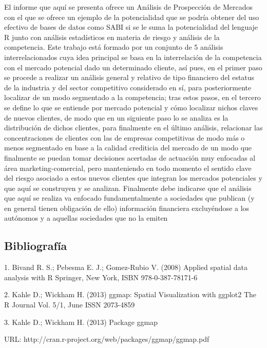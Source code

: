     El informe que aquí se presenta ofrece un Análisis de Prospección de Mercados con el que se ofrece un ejemplo de la potencialidad que se podría obtener del uso efectivo de bases de datos como SABI si se le suma la potencialidad del lenguaje R junto con análisis estadísticos en materia de riesgo y análisis de la competencia.
    Este trabajo está formado por un conjunto de 5 análisis interrelacionados cuya idea principal se basa en la interrelación de la competencia con el mercado potencial dado un determinado cliente, así pues, en el primer paso se procede a realizar un análisis general y relativo de tipo financiero del estatus de la industria y del sector competitivo considerado en sí, para posteriormente localizar de un modo segmentado a la competencia; tras estos pasos, en el tercero se define lo que se entiende por mercado potencial y cómo localizar nichos claves de nuevos clientes, de modo que en un siguiente paso lo se analiza es la distribución de dichos clientes, para finalmente en el último análisis, relacionar las concentraciones de clientes con las de empresas competitivas de modo más o menos segmentado en base a la calidad crediticia del mercado de un modo que finalmente se puedan tomar decisiones acertadas de actuación muy enfocadas al área marketing-comercial, pero manteniendo en todo momento el sentido clave del riesgo asociado a estos nuevos clientes que integran los mercados potenciales y que aquí se construyen y se analizan.
    Finalmente debe indicarse que el análisis que aquí se realiza va enfocado fundamentalmente a sociedades que publican (y en general tienen obligación de ello) información financiera excluyéndose a los autónomos y a aquellas sociedades que no la emiten \bigskip\subsection*{Bibliografía}

 1. Bivand R. S.; Pebesma E. J.; Gomez-Rubio V. (2008) Applied spatial data analysis with R Springer, New York, ISBN 978-0-387-78171-6



2. Kahle D.; Wickham H. (2013) ggmap: Spatial Visualization with ggplot2 The R Journal Vol. 5/1, June ISSN 2073-4859



3. Kahle D.; Wickham H. (2013) Package ggmap

URL: http://cran.r-project.org/web/packages/ggmap/ggmap.pdf 



%

%
